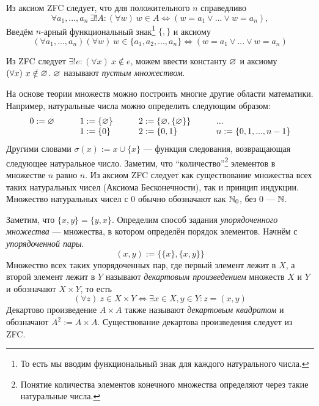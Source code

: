 Из аксиом ZFC следует, что для положительного $n$ справедливо
\[
  \forall a_1,...,a_{n}~\exists !A:(\forall w)~
  w\in A\iff (w=a_1\lor...\lor w=a_{n}),
\]
Введём $n$-арный функциональный знак\footnote{
  То есть мы вводим функциональный знак для каждого натурального числа.}
$\{,\}$ и аксиому
\[
  (\forall a_1,...,a_{n})(\forall w)~
  w\in \{a_1,a_2,...,a_{n}\}\iff (w=a_1\lor ...\lor w=a_{n})
\]

Из ZFC следует ${\exists !e:(\forall x)~x\notin e}$,
можем ввести константу $\varnothing$ и аксиому $(\forall x)~x\notin \varnothing$.
$\varnothing$ называют {\it пустым множеством}.

На основе теории множеств можно построить многие другие области математики.
Например, натуральные числа можно определить следующим образом:
\[
  \begin{array}{llll}
    0 :=\varnothing\qquad & 1  :=\{\varnothing\}\qquad & 2  :=\{\varnothing,\{\varnothing\}\}\qquad & ... \\
                    & 1:=\{0\}\qquad       & 2:=\{0,1\}
                    & n:=\{0,1,...,n-1\}
  \end{array}
\]
Другими словами $\sigma(x):=x\cup \{x\}$ --- функция следования,
возвращающая следующее натуральное число. Заметим, что ``количество''\footnote{
  Понятие количества элементов конечного множества определяют
  через такие натуральные числа.} элементов
в множестве $n$ равно $n$. Из аксиом ZFC следует как существование множества
всех таких натуральных чисел (Аксиома Бесконечности), так и принцип индукции.
Множество натуральных чисел с $0$ обычно обозначают как $\mathbb N_0$,
без $0$ --- $\mathbb N$.

Заметим, что $\{x,y\}=\{y,x\}$. Определим способ задания
{\it упорядоченного множества} --- множества, в котором определён порядок элементов.
Начнём с {\it упорядоченной пары}.
\[
  (x,y):=\{\{x\},\{x,y\}\}
\]
Множество
всех таких упорядоченных пар, где первый элемент лежит в $X$, а второй элемент
лежит в $Y$ называют {\it декартовым произведением}
 множеств $X$ и $Y$ и
обозначают $X\times Y$, то есть
\[
  (\forall z)~z\in X\times Y\iff \exists x\in X,y\in Y:z=(x,y)
\]
Декартово произведение $A\times A$ также называют {\it декартовым квадратом}
и обозначают $A^{2}:=A\times A$. Существование декартова произведения следует из ZFC.

